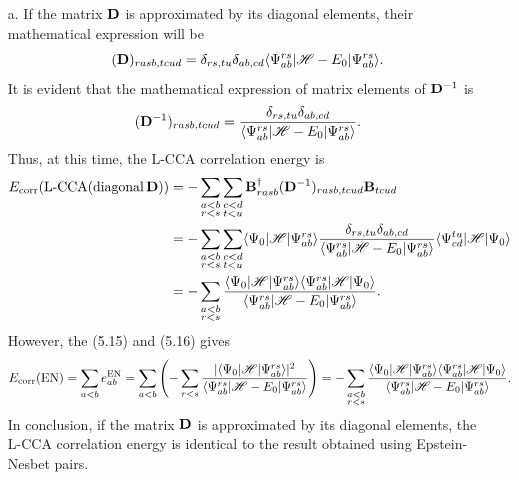 \documentclass[a4paper]{book}
\newcounter{solution}[chapter]
\newcommand{\corr}{{\rm corr}}
\newcommand{\B}{{\bf B}}
\newcommand{\D}{{\bf D}}
\begin{document}
	\begin{solution}
	
	\begin{itemize}
	
	\item[a.] If the matrix $\D$ is approximated by its diagonal elements, their mathematical expression will be
	\[
		(\D)_{rasb,tcud} = \delta_{rs,tu} \delta_{ab,cd} \langle \Psi^{rs}_{ab} | \mathscr{H} - E_0 | \Psi^{rs}_{ab} \rangle .
	\]	
	It is evident that the mathematical expression of matrix elements of $\D^{-1}$ is
	\[
		(\D^{-1})_{rasb,tcud} = \frac{ \delta_{rs,tu} \delta_{ab,cd} }{ \langle \Psi^{rs}_{ab} | \mathscr{H} - E_0 | \Psi^{rs}_{ab} \rangle } .
	\]
	Thus, at this time, the L-CCA correlation energy is
	\begin{align*}
		E_\corr(\text{L-CCA(diagonal\,\D}) ) &= - \sum_{ \substack{ a<b \\ r<s } } \sum_{ \substack{ c<d \\ t<u } } \B^\dagger_{rasb} (\D^{-1})_{rasb,tcud} \B_{tcud} \\
		&= - \sum_{ \substack{ a<b \\ r<s } } \sum_{ \substack{ c<d \\ t<u } } \langle \Psi_0 | \mathscr{H} | \Psi^{rs}_{ab} \rangle \frac{ \delta_{rs,tu} \delta_{ab,cd} }{ \langle \Psi^{rs}_{ab} | \mathscr{H} - E_0 | \Psi^{rs}_{ab} \rangle } \langle \Psi^{tu}_{cd} | \mathscr{H} | \Psi_0 \rangle \\
		&= - \sum_{ \substack{ a<b \\ r<s } } \frac{ \langle \Psi_0 | \mathscr{H} | \Psi^{rs}_{ab} \rangle \langle \Psi^{rs}_{ab} | \mathscr{H} | \Psi_0 \rangle }{ \langle \Psi^{rs}_{ab} | \mathscr{H} - E_0 | \Psi^{rs}_{ab} \rangle } .
	\end{align*}
	However, the (5.15) and (5.16) gives
	\[
		E_\corr({\rm EN}) = \sum_{a<b} e^{\rm EN}_{ab} = \sum_{ a<b } \left( - \sum_{ r<s } \frac{ | \langle \Psi_0 | \mathscr{H} | \Psi^{rs}_{ab} \rangle |^2 }{ \langle \Psi^{rs}_{ab} | \mathscr{H} - E_0 | \Psi^{rs}_{ab} \rangle } \right) = - \sum_{ \substack{ a<b \\ r<s } } \frac{ \langle \Psi_0 | \mathscr{H} | \Psi^{rs}_{ab} \rangle \langle \Psi^{rs}_{ab} | \mathscr{H} | \Psi_0 \rangle }{ \langle \Psi^{rs}_{ab} | \mathscr{H} - E_0 | \Psi^{rs}_{ab} \rangle }.
	\]
	In conclusion, if the matrix $\D$ is approximated by its diagonal elements, the L-CCA correlation energy is identical to the result obtained using Epstein-Nesbet pairs.
	

\end{itemize}
\end{solution}
\end{document}
